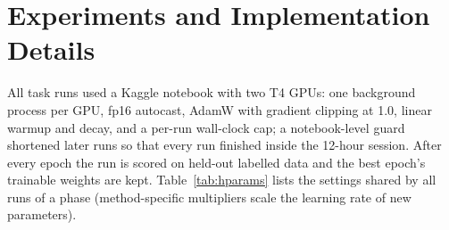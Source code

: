\documentclass[11pt]{article}
\begin{document}
\section{Experiments and Implementation Details}
\label{sec:experiments}
All task runs used a Kaggle notebook with two T4 GPUs: one background process per GPU, fp16 autocast, AdamW with gradient clipping at 1.0, linear warmup and decay, and a per-run wall-clock cap; a notebook-level guard shortened later runs so that every run finished inside the 12-hour session. After every epoch the run is scored on held-out labelled data and the best epoch's trainable weights are kept. Table~\ref{tab:hparams} lists the settings shared by all runs of a phase (method-specific multipliers scale the learning rate of new parameters).

\begin{table}[H]
\centering\small
\caption{Training settings shared by all runs of each phase.}
\label{tab:hparams}
\end{table}
\end{document}
